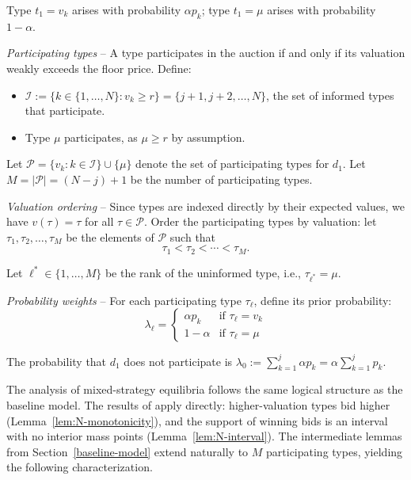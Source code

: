 \documentclass[11pt]{article}
\theoremstyle{plain}
\theoremstyle{definition}
\theoremstyle{plain}
\theoremstyle{plain}
\theoremstyle{plain}
\theoremstyle{plain}
\numberwithin{equation}{section}
\begin{document}
\noindent Type $t_1 = v_k$ arises with probability $\alpha p_k$; type $t_1 = \mu$ arises with probability $1-\alpha$.

\vspace{0.3cm}

\noindent \emph{Participating types} -- A type participates in the auction if and only if its valuation weakly exceeds the floor price. Define:
\begin{itemize}
    \item $\mathcal{I} := \{k \in \{1,\ldots,N\} : v_k \geq r\} = \{j+1, j+2, \ldots, N\}$, the set of informed types that participate.
    \item Type $\mu$ participates, as $\mu \geq r$ by assumption.
\end{itemize}

\noindent Let $\mathcal{P} = \{v_k : k \in \mathcal{I}\} \cup \{\mu\}$ denote the set of participating types for $d_1$. Let $M = |\mathcal{P}| = (N - j) + 1$ be the number of participating types.

\vspace{0.3cm}

\noindent \emph{Valuation ordering} -- Since types are indexed directly by their expected values, we have $v(\tau) = \tau$ for all $\tau \in \mathcal{P}$. Order the participating types by valuation: let $\tau_1, \tau_2, \ldots, \tau_M$ be the elements of $\mathcal{P}$ such that
\[
\tau_1 < \tau_2 < \cdots < \tau_M.
\]

\noindent Let $\ell^* \in \{1, \ldots, M\}$ be the rank of the uninformed type, i.e., $\tau_{\ell^*} = \mu$.

\vspace{0.3cm}

\noindent \emph{Probability weights} -- For each participating type $\tau_\ell$, define its prior probability:
\[
\lambda_\ell = \begin{cases}
\alpha p_k & \text{if } \tau_\ell = v_k \\
1 - \alpha & \text{if } \tau_\ell = \mu
\end{cases}
\]

\noindent The probability that $d_1$ does not participate is $\lambda_0 := \sum_{k=1}^{j} \alpha p_k = \alpha \sum_{k=1}^{j} p_k$.

\vspace{0.3cm}

\noindent The analysis of mixed-strategy equilibria follows the same logical structure as the baseline model. The results of \textcite{maskinEquilibriumSealedHigh2000} apply directly: higher-valuation types bid higher (Lemma~\ref{lem:N-monotonicity}), and the support of winning bids is an interval with no interior mass points (Lemma~\ref{lem:N-interval}). The intermediate lemmas from Section~\ref{baseline-model} extend naturally to $M$ participating types, yielding the following characterization.
\end{document}
